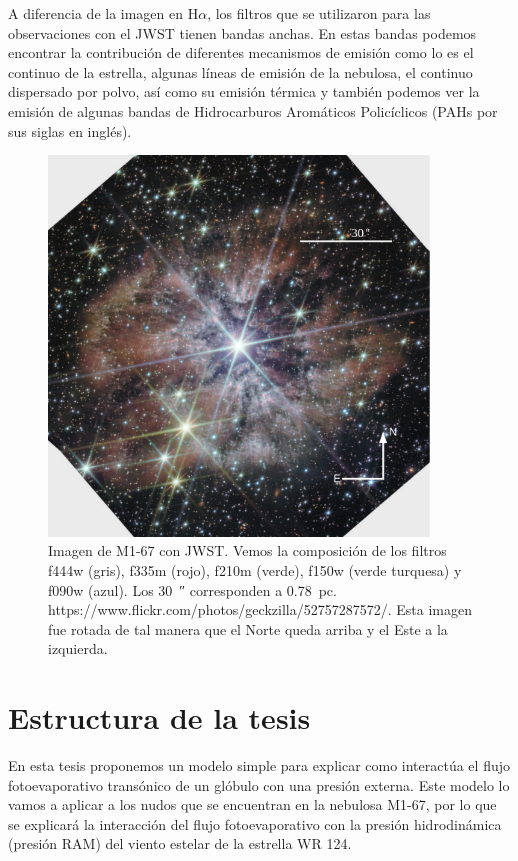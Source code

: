 \documentclass{book}
\begin{document}
A diferencia de la imagen en H$\alpha$, los filtros que se utilizaron para
las observaciones con el JWST tienen bandas anchas. En estas bandas
podemos encontrar la contribución de diferentes mecanismos de emisión
como lo es el continuo de la estrella, algunas líneas de emisión de la
nebulosa, el continuo dispersado por polvo, así como su emisión
térmica y también podemos ver la emisión de algunas bandas de
Hidrocarburos Aromáticos Policíclicos (PAHs por sus siglas en inglés).

\begin{figure}[htb]
    \centering
    \includegraphics[width=0.9\textwidth]{ultimas correcciones/WR124_JWST.pdf}
    \caption{Imagen de M1-67 con JWST. Vemos la composición de los
      filtros f444w (gris), f335m (rojo), f210m (verde), f150w (verde
      turquesa) y f090w (azul). Los \SI{30}{\arcsecond} corresponden a
      \SI{0.78}{pc}.
      https://www.flickr.com/photos/geckzilla/52757287572/. Esta
      imagen fue rotada de tal manera que el Norte queda arriba y el
      Este a la izquierda.}
    \label{fig:M1-67JWST}
\end{figure}

\section{Estructura de la tesis}

En esta tesis proponemos un modelo simple para explicar como
interactúa el flujo fotoevaporativo transónico de un glóbulo con una
presión externa. Este modelo lo vamos a aplicar a los nudos que se
encuentran en la nebulosa M1-67, por lo que se explicará la
interacción del flujo fotoevaporativo con la presión hidrodinámica
(presión RAM) del viento estelar de la estrella WR 124.
\end{document}
